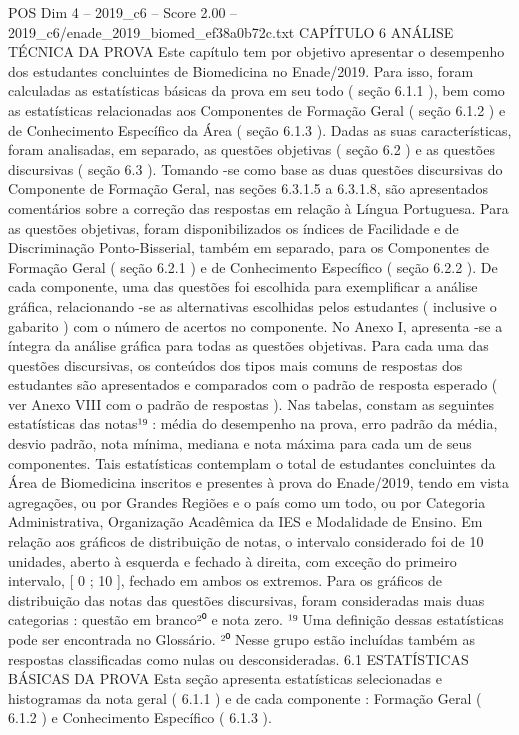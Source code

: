 \begin{textsample}{POS Dim 4 – 2019\_c6 – Score 2.00 – 2019\_c6/enade\_2019\_biomed\_ef38a0b72c.txt}  \label{ex:f4_pos_099}
CAPÍTULO 6 ANÁLISE TÉCNICA DA PROVA Este capítulo tem por objetivo apresentar o desempenho dos estudantes concluintes de Biomedicina no Enade/2019.
Para isso, foram calculadas as estatísticas básicas da prova em seu todo ( seção 6.1.1 ), bem como as estatísticas relacionadas aos Componentes de Formação Geral ( seção 6.1.2 ) e de Conhecimento Específico da Área ( seção 6.1.3 ).
Dadas as suas características, foram analisadas, em separado, as questões objetivas ( seção 6.2 ) e as questões discursivas ( seção 6.3 ).
Tomando -se como base as duas questões discursivas do Componente de Formação Geral, nas seções 6.3.1.5 a 6.3.1.8, são apresentados comentários sobre a correção das respostas em relação à Língua Portuguesa.
Para as questões objetivas, foram disponibilizados os índices de Facilidade e de Discriminação Ponto-Bisserial, também em separado, para os Componentes de Formação Geral ( seção 6.2.1 ) e de Conhecimento Específico ( seção 6.2.2 ).
De cada componente, uma das questões foi escolhida para exemplificar a análise gráfica, relacionando -se as alternativas escolhidas pelos estudantes ( inclusive o gabarito ) com o número de acertos no componente.
No Anexo I, apresenta -se a íntegra da análise gráfica para todas as questões objetivas.
Para cada uma das questões discursivas, os conteúdos dos tipos mais comuns de respostas dos estudantes são apresentados e comparados com o padrão de resposta esperado ( ver Anexo VIII com o padrão de respostas ).
Nas tabelas, constam as seguintes estatísticas das notas¹⁹ : média do desempenho na prova, erro padrão da média, desvio padrão, nota mínima, mediana e nota máxima para cada um de seus componentes.
Tais estatísticas contemplam o total de estudantes concluintes da Área de Biomedicina inscritos e presentes à prova do Enade/2019, tendo em vista agregações, ou por Grandes Regiões e o país como um todo, ou por Categoria Administrativa, Organização Acadêmica da IES e Modalidade de Ensino.
Em relação aos gráficos de distribuição de notas, o intervalo considerado foi de 10 unidades, aberto à esquerda e fechado à direita, com exceção do primeiro intervalo, [ 0 ; 10 ], fechado em ambos os extremos.
Para os gráficos de distribuição das notas das questões discursivas, foram consideradas mais duas categorias : questão em branco²⁰ e nota zero. ¹⁹ Uma definição dessas estatísticas pode ser encontrada no Glossário. ²⁰ Nesse grupo estão incluídas também as respostas classificadas como nulas ou desconsideradas. 6.1 ESTATÍSTICAS BÁSICAS DA PROVA Esta seção apresenta estatísticas selecionadas e histogramas da nota geral ( 6.1.1 ) e de cada componente : Formação Geral ( 6.1.2 ) e Conhecimento Específico ( 6.1.3 ).

\end{textsample}
